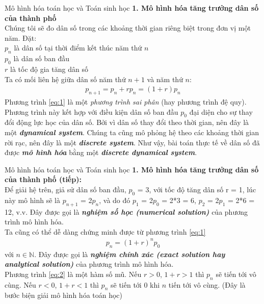 \documentclass[pdf,aspectratio=169]{beamer}
\newcommand{\N}{\mathbb{N}}
\begin{document}
\begin{frame}{Mô hình hóa toán học và Toán sinh học}
    \textbf{1. Mô hình hóa tăng trưởng dân số của thành phố} \\
    Chúng tôi sẽ đo dân số trong các khoảng thời gian riêng biệt trong
    đơn vị một năm. Đặt: \\
    \quad $p_n$ là dân số tại thời điểm kết thúc năm thứ $n$ \\
    \quad $p_0$ là dân số ban đầu \\
    \quad $r$ là tốc độ gia tăng dân số \\
    Ta có mối liên hệ giữa dân số năm thứ $n+1$ và năm thứ $n$:
    \begin{align}
        \label{eq:1}
        p_{n+1} = p_n + rp_n = (1+r)p_n
    \end{align}
    Phương trình \ref{eq:1} là một \textit{phương trình sai phân} (hay phương trình đệ quy).
    Phương trình này kết hợp với điều kiện dân số ban đầu $p_0$ đại diện cho sự thay đổi động lực học của dân số.
    Bởi vì dân số thay đổi theo thời gian, nên đây là một \textbf{\textit{dynamical system}}.
    Chúng ta cũng mô phỏng hệ theo các khoảng thời gian rời rạc, nên đây là một \textbf{\textit{discrete system}}.
    Như vậy, bài toán thực tế về dân số đã được \textbf{\textit{mô hình hóa}} bằng một \textbf{\textit{discrete dynamical system}}.
\end{frame}

\begin{frame}{Mô hình hóa toán học và Toán sinh học}
    \textbf{1. Mô hình hóa tăng trưởng dân số của thành phố (tiếp):} \\
    Để giải hệ trên, giả sử dân số ban đầu, $p_0$ = 3, với tốc độ tăng dân số r = 1, lúc này mô hình sẽ là $p_{n+1}$ = 2$p_n$, và do đó $p_1$ = 2$p_0$ = 2*3 = 6, $p_2$ = 2$p_1$ = 2*6 = 12, v.v. Đây được gọi là \textbf{\textit{nghiệm số học (numerical solution)}} của phương trình mô hình hóa.\\
    Ta cũng có thể dễ dàng chứng minh được từ phương trình \ref{eq:1}
    \begin{align}
        \label{eq:2}
        p_{n} = (1+r)^np_0
    \end{align}
    với $n\in \N$. Đây được gọi là \textbf{\textit{nghiệm chính xác (exact solution hay analytical solution)}} của phương trình mô hình hóa.\\
    Phương trình \ref{eq:2} là một hàm số mũ. Nếu $r>0$, $1+r>1$ thì $p_{n}$ sẽ tiến tới vô cùng.
    Nếu $r<0$, $1+r<1$ thì $p_{n}$ sẽ tiến tới $0$ khi $n$ tiến tới vô cùng. (Đây là bước biện giải mô hình hóa toán học)
\end{frame}
\end{document}
